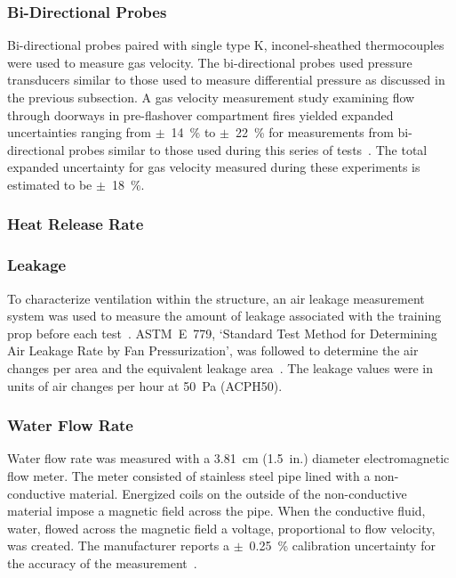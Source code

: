 \documentclass[12pt,oneside]{book}
\begin{document}
\subsubsection*{Bi-Directional Probes}
Bi-directional probes paired with single type K, inconel-sheathed thermocouples were used to measure gas velocity. The bi-directional probes used pressure transducers similar to those used to measure differential pressure as discussed in the previous subsection. A gas velocity measurement study examining flow through doorways in pre-flashover compartment fires yielded expanded uncertainties ranging from $\pm$~14~\% to $\pm$~22~\% for measurements from bi-directional probes similar to those used during this series of tests~\cite{Bryant:FSJ2009}. The total expanded uncertainty for gas velocity measured during these experiments is estimated to be $\pm$~18~\%. 

\subsubsection*{Heat Release Rate}

\subsubsection*{Leakage} 
To characterize ventilation within the structure, an air leakage measurement system was used to measure the amount of leakage associated with the training prop before each test~\cite{retrotec:leakage}. ASTM~E~779, `Standard Test Method for Determining Air Leakage Rate by Fan Pressurization', was followed to determine the air changes per area and the equivalent leakage area~\cite{astm_e779}. The leakage values were in units of air changes per hour at 50~Pa (ACPH50). 

\subsubsection*{Water Flow Rate}
Water flow rate was measured with a 3.81~cm (1.5~in.) diameter electromagnetic flow meter. The meter consisted of stainless steel pipe lined with a non-conductive material. Energized coils on the outside of the non-conductive material impose a magnetic field across the pipe. When the conductive fluid, water, flowed across the magnetic field a voltage, proportional to flow velocity, was created. The manufacturer reports a $\pm$~0.25~\% calibration uncertainty for the accuracy of the measurement~\cite{Badger:2015}. 
\end{document}

